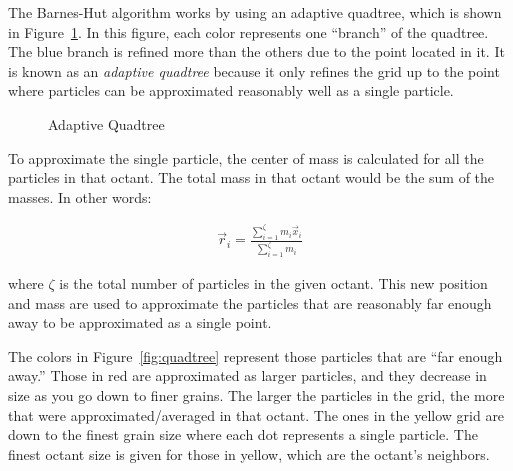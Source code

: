 The Barnes-Hut algorithm works by using an adaptive quadtree, which is shown in Figure~\ref{fig:sep}. In this figure, each color represents one ``branch'' of the quadtree. The blue branch is refined more than the others due to the point located in it. It is known as an {\em adaptive quadtree} because it only refines the grid up to the point where particles can be approximated reasonably well as a single particle.

\begin{figure}[H]
\centering
{}
\caption{Adaptive Quadtree}
\label{fig:sep}
\end{figure}

To approximate the single particle, the center of mass is calculated for all the particles in that octant. The total mass in that octant would be the sum of the masses. In other words:

\begin{align}
\vec{r}_{i} = \frac{\sum_{i=1}^{\zeta}m_{i}\vec{x}_{i}}{\sum_{i=1}^{\zeta}m_{i}}
\end{align}

where $\zeta$ is the total number of particles in the given octant. This new position and mass are used to approximate the particles that are reasonably far enough away to be approximated as a single point.

The colors in Figure~\ref{fig:quadtree} represent those particles that are ``far enough away.'' Those in red are approximated as larger particles, and they decrease in size as you go down to finer grains. The larger the particles in the grid, the more that were approximated/averaged in that octant. The ones in the yellow grid are down to the finest grain size where each dot represents a single particle. The finest octant size is given for those in yellow, which are the octant's neighbors. 

